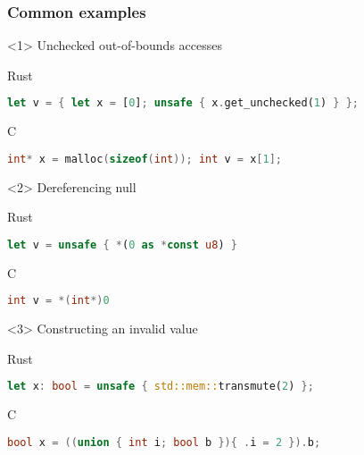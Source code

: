 \begin{frame}[fragile, t]
    \frametitle{Common examples}

    \begin{onlyenv}<1>
        Unchecked out-of-bounds accesses
        \begin{block}{Rust}
            \begin{lstlisting}[language=rust]
let v = { let x = [0]; unsafe { x.get_unchecked(1) } };
            \end{lstlisting}
        \end{block}

        \begin{block}{C}
            \begin{lstlisting}[language=c]
int* x = malloc(sizeof(int)); int v = x[1];
            \end{lstlisting}
        \end{block}
    \end{onlyenv}

    \begin{onlyenv}<2>
        Dereferencing null
        \begin{block}{Rust}
            \begin{lstlisting}[language=rust]
let v = unsafe { *(0 as *const u8) }
            \end{lstlisting}
        \end{block}

        \begin{block}{C}
            \begin{lstlisting}[language=c]
int v = *(int*)0
            \end{lstlisting}
        \end{block}
    \end{onlyenv}

    \begin{onlyenv}<3>
        Constructing an invalid value
        \begin{block}{Rust}
            \begin{lstlisting}[language=rust]
let x: bool = unsafe { std::mem::transmute(2) };
            \end{lstlisting}
        \end{block}

        \begin{block}{C}
            \begin{lstlisting}[language=c]
bool x = ((union { int i; bool b }){ .i = 2 }).b;
            \end{lstlisting}
        \end{block}
    \end{onlyenv}
\end{frame}

